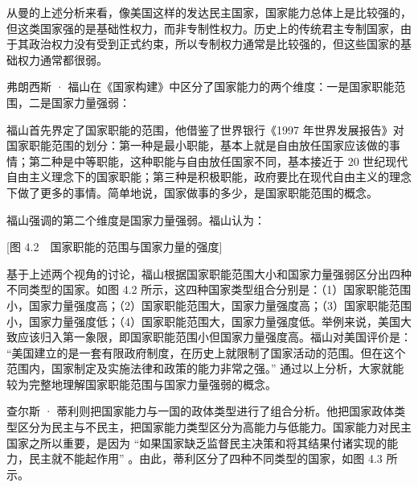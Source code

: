 从曼的上述分析来看，像美国这样的发达民主国家，国家能力总体上是比较强的，但这类国家强的是基础性权力，而非专制性权力。历史上的传统君主专制国家，由于其政治权力没有受到正式约束，所以专制权力通常是比较强的，但这些国家的基础权力通常都很弱。

弗朗西斯 · 福山在《国家构建》中区分了国家能力的两个维度：一是国家职能范围，二是国家力量强弱：


福山首先界定了国家职能的范围，他借鉴了世界银行《1997 年世界发展报告》对国家职能范围的划分：第一种是最小职能，基本上就是自由放任国家应该做的事情；第二种是中等职能，这种职能与自由放任国家不同，基本接近于 20 世纪现代自由主义理念下的国家职能；第三种是积极职能，政府要比在现代自由主义的理念下做了更多的事情。简单地说，国家做事的多少，是国家职能范围的概念。

福山强调的第二个维度是国家力量强弱。福山认为：


[图 4.2　国家职能的范围与国家力量的强度]

基于上述两个视角的讨论，福山根据国家职能范围大小和国家力量强弱区分出四种不同类型的国家。如图 4.2 所示，这四种国家类型组合分别是：（1）国家职能范围小，国家力量强度高；（2）国家职能范围大，国家力量强度高；（3）国家职能范围小，国家力量强度低；（4）国家职能范围大，国家力量强度低。举例来说，美国大致应该归入第一象限，即国家职能范围小但国家力量强度高。福山对美国评价是： “美国建立的是一套有限政府制度，在历史上就限制了国家活动的范围。但在这个范围内，国家制定及实施法律和政策的能力非常之强。” 通过以上分析，大家就能较为完整地理解国家职能范围与国家力量强弱的概念。

查尔斯 · 蒂利则把国家能力与一国的政体类型进行了组合分析。他把国家政体类型区分为民主与不民主，把国家能力类型区分为高能力与低能力。国家能力对民主国家之所以重要，是因为 “如果国家缺乏监督民主决策和将其结果付诸实现的能力，民主就不能起作用” 。由此，蒂利区分了四种不同类型的国家，如图 4.3 所示。

